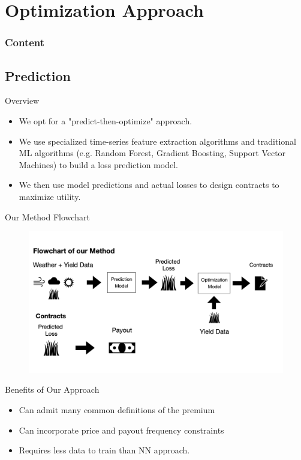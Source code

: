 \documentclass{beamer}
\begin{document}
\section{Optimization Approach}
\begin{frame}
    \frametitle{Content}
    \tableofcontents[currentsection]
  \end{frame}
\subsection{Prediction}
\begin{frame}{Overview}
    \begin{itemize}
        \setlength\itemsep{2em}
        \item We opt for a "predict-then-optimize" approach.
        \item We use specialized time-series feature extraction algorithms and traditional ML algorithms (e.g. Random Forest, Gradient Boosting, Support Vector Machines) to build a loss prediction model.
        \item We then use model predictions and actual losses to design contracts to maximize utility. 
    \end{itemize}
\end{frame}

\begin{frame}{Our Method Flowchart}
    \begin{figure}
        \includegraphics[width=\textwidth]{../../../output/figures/Our Method Flowchart.png}
    \end{figure}
\end{frame}

\begin{frame}{Benefits of Our Approach}
    \begin{itemize}
        \setlength\itemsep{2em}
        \item Can admit many common definitions of the premium
        \item Can incorporate price and payout frequency constraints
        \item Requires less data to train than NN approach. 
    \end{itemize}
\end{frame}
\end{document}
